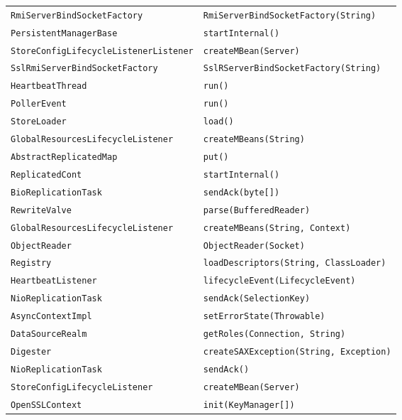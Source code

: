 \begin{center}
\begin{longtable}{ll}
\lstinline/RmiServerBindSocketFactory/&{\lstinline/RmiServerBindSocketFactory(String)/}\\
\lstinline/PersistentManagerBase/&{\hspace*{-3pt}\lstinline/startInternal()/}\\
\lstinline/StoreConfigLifecycleListenerListener/&{\lstinline/createMBean(Server)/}\\
\lstinline/SslRmiServerBindSocketFactory/&{\lstinline/SslRServerBindSocketFactory(String)/}\\
\lstinline/HeartbeatThread/&{\lstinline/run()/}\\
\lstinline/PollerEvent/&{\lstinline/run()/}\\
\lstinline/StoreLoader/&{\lstinline/load()/}\\
\lstinline/GlobalResourcesLifecycleListener/&{\lstinline/createMBeans(String)/}\\
\lstinline/AbstractReplicatedMap/&{\lstinline/put()/}\\
\lstinline/ReplicatedCont/&{\hspace*{-3pt}\lstinline/startInternal()/}\\
\lstinline/BioReplicationTask/&{\lstinline/sendAck(byte[])/}\\
\lstinline/RewriteValve/&{\lstinline/parse(BufferedReader)/}\\
\lstinline/GlobalResourcesLifecycleListener/&{\lstinline/createMBeans(String, Context)/}\\
\lstinline/ObjectReader/&{\lstinline/ObjectReader(Socket)/}\\
\lstinline/Registry/&{\lstinline/loadDescriptors(String, ClassLoader)/}\\
\lstinline/HeartbeatListener/&{\lstinline/lifecycleEvent(LifecycleEvent)/}\\
\lstinline/NioReplicationTask/&{\lstinline/sendAck(SelectionKey)/}\\
\lstinline/AsyncContextImpl/&{\lstinline/setErrorState(Throwable)/}\\
\lstinline/DataSourceRealm/&{\lstinline/getRoles(Connection, String)/}\\
\lstinline/Digester/&{\lstinline/createSAXException(String, Exception)/}\\
\lstinline/NioReplicationTask/&{\lstinline/sendAck()/}\\
\lstinline/StoreConfigLifecycleListener/&{\lstinline/createMBean(Server)/}\\
\lstinline/OpenSSLContext/&{\hspace*{-2pt}\lstinline/init(KeyManager[])/}\\

\end{longtable}
\end{center}
